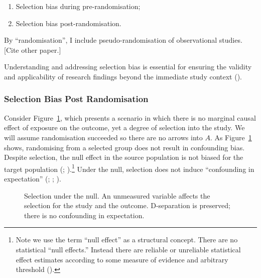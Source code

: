 \documentclass[
  singlecolumn,
  9pt]{article}
\providecommand{\tightlist}{%
  \setlength{\itemsep}{0pt}\setlength{\parskip}{0pt}}\usepackage{longtable,booktabs,array}
\begin{document}
\begin{enumerate}
\def\labelenumi{(\arabic{enumi})}
\tightlist
\item
  Selection bias during pre-randomisation;
\item
  Selection bias post-randomisation.
\end{enumerate}

By ``randomisation'', I include pseudo-randomisation of observational
studies. {[}Cite other paper.{]}

Understanding and addressing selection bias is essential for ensuring
the validity and applicability of research findings beyond the immediate
study context ().

\subsubsection{Selection Bias Post
Randomisation}\label{selection-bias-post-randomisation}

Consider Figure~\ref{fig-1}, which presents a scenario in which there is
no marginal causal effect of exposure on the outcome, yet a degree of
selection into the study. We will assume randomisation succeeded so
there are no arrows into \(A\). As Figure~\ref{fig-1} shows, randomising
from a selected group does not result in confounding bias. Despite
selection, the null effect in the source population is not biased for
the target population (;
).\footnote{Note we use the
  term ``null effect'' as a structural concept. There are no statistical
  ``null effects.'' Instead there are reliable or unreliable statistical
  effect estimates according to some measure of evidence and arbitrary
  threshold ().}
Under the null, selection does not induce ``confounding in expectation''
(;
;
).

\begin{figure}


\caption{\label{fig-1}Selection under the null. An unmeasured variable
affects the selection for the study and the outcome. D-separation is
preserved; there is no confounding in expectation.}

\end{figure}%
\end{document}
